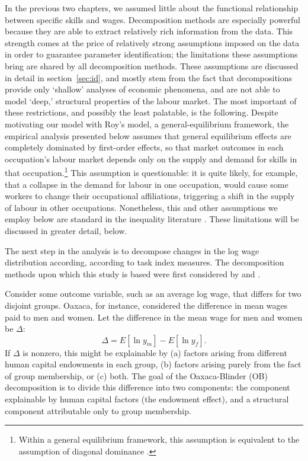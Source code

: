In the previous two chapters, we assumed little about the functional relationship between specific skills and wages. Decomposition methods are especially powerful because they are able to extract relatively rich information from the data. This strength comes at the price of relatively strong assumptions imposed on the data in order to guarantee parameter identification; the limitations these assumptions bring are shared by all decomposition methods. These assumptions are discussed in detail in section~\ref{sec:id}, and mostly stem from the fact that decompositions provide only `shallow' analyses of economic phenomena, and are not able to model `deep,' structural properties of the labour market. The most important of these restrictions, and possibly the least palatable, is the following. Despite motivating our model with Roy's model, a general-equilibrium framework, the empirical analysis presented below assumes that general equilibrium effects are completely dominated by first-order effects, so that market outcomes in each occupation's labour market depends only on the supply and demand for skills in that occupation.\footnote{Within a general equilibrium framework, this assumption is equivalent to the assumption of diagonal dominance \citep[p.233]{Arrow1971}.} This assumption is questionable: it is quite likely, for example, that a collapse in the demand for labour in one occupation, would cause some workers to change their occupational affiliations, triggering a shift in the supply of labour in other occupations. Nonetheless, this and other assumptions we employ below are standard in the inequality literature \citep[p.1]{Fortin2011}. These limitations will be discussed in greater detail, below.


The next step in the analysis is to decompose changes in the log wage distribution according, according to task index measures. The decomposition methods upon which this study is based were first considered by \citet{Oaxaca1973} and \citet{Blinder1973}. 

Consider some outcome variable, such as an average log wage, that differs for two disjoint groups. Oaxaca, for instance, considered the difference in mean wages paid to men and women. Let the difference in the mean wage for men and women be $\Delta$:
\begin{equation} \Delta = E[\ln y_m] - E[\ln y_f]. \label{eq:odec} \end{equation}
If $\Delta$ is nonzero, this might be explainable by (a) factors arising from different human capital endowments in each group, (b) factors arising purely from the fact of group membership, or (c) both. The goal of the Oaxaca-Blinder (OB) decomposition is to divide this difference into two components: the component explainable by human capital factors (the endowment effect), and a structural component attributable only to group membership.

